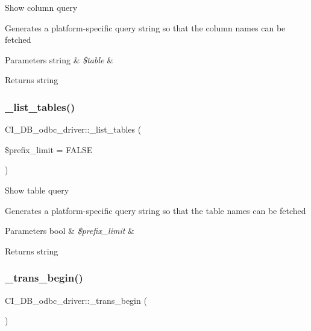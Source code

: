 Show column query

Generates a platform-\/specific query string so that the column names can be fetched


\begin{DoxyParams}[1]{Parameters}
string & {\em \$table} & \\
\hline
\end{DoxyParams}
\begin{DoxyReturn}{Returns}
string 
\end{DoxyReturn}
\mbox{\label{class_c_i___d_b__odbc__driver_a2cb15dc00978503e666b85443352e7b9}} 
\subsubsection{\texorpdfstring{\+\_\+list\+\_\+tables()}{\_list\_tables()}}
{\footnotesize\ttfamily C\+I\+\_\+\+D\+B\+\_\+odbc\+\_\+driver\+::\+\_\+list\+\_\+tables (\begin{DoxyParamCaption}\item[{}]{\$prefix\+\_\+limit = {\ttfamily FALSE} }\end{DoxyParamCaption})\hspace{0.3cm}{\ttfamily [protected]}}

Show table query

Generates a platform-\/specific query string so that the table names can be fetched


\begin{DoxyParams}[1]{Parameters}
bool & {\em \$prefix\+\_\+limit} & \\
\hline
\end{DoxyParams}
\begin{DoxyReturn}{Returns}
string 
\end{DoxyReturn}
\mbox{\label{class_c_i___d_b__odbc__driver_a69523257786e9806d061ffaa161b6d86}} 
\subsubsection{\texorpdfstring{\+\_\+trans\+\_\+begin()}{\_trans\_begin()}}
{\footnotesize\ttfamily C\+I\+\_\+\+D\+B\+\_\+odbc\+\_\+driver\+::\+\_\+trans\+\_\+begin (\begin{DoxyParamCaption}{ }\end{DoxyParamCaption})\hspace{0.3cm}{\ttfamily [protected]}}

